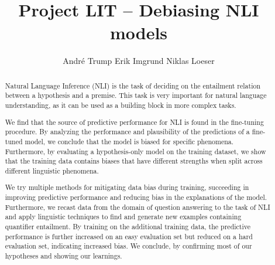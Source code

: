 \documentclass[11pt]{article}
\title{Project LIT -- Debiasing \acs{NLI} models}
\author{André Trump \And
  Erik Imgrund \And
  Niklas Loeser }
\begin{document}


\maketitle
\begin{abstract}
Natural Language Inference (NLI) is the task of deciding on the entailment relation between a hypothesis and a premise. This task is very important for natural language understanding, as it can be used as a building block in more complex tasks. 

We find that the source of predictive performance for \acs{NLI} is found in the fine-tuning procedure. By analyzing the performance and plausibility of the predictions of a fine-tuned model, we conclude that the model is biased for specific phenomena. Furthermore, by evaluating a hypothesis-only model on the training dataset, we show that the training data contains biases that have different strengths when split across different linguistic phenomena.

We try multiple methods for mitigating data bias during training, succeeding in improving predictive performance and reducing bias in the explanations of the model. Furthermore, we recast data from the domain of question answering to the task of \acs{NLI} and apply linguistic techniques to find and generate new examples containing quantifier entailment. By training on the additional training data, the predictive performance is further increased on an easy evaluation set but reduced on a hard evaluation set, indicating increased bias. We conclude, by confirming most of our hypotheses and showing our learnings.
\end{abstract}







\FloatBarrier



\FloatBarrier
\appendix

\end{document}
